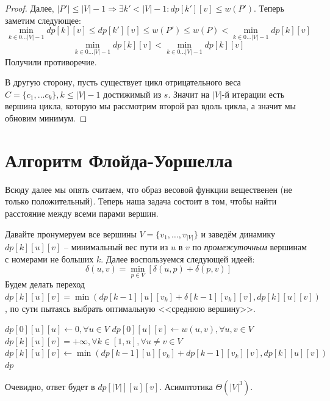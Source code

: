 \begin{proof}
    Далее, $|P'| \leq |V| - 1 \Rightarrow \exists k' < |V| - 1: dp[k'][v] \leq w(P')$. Теперь заметим следующее:
    \begin{equation*}
        \min\limits_{k \in 0 \dots |V| - 1} dp[k][v] \leq dp[k'][v] \leq w(P') \leq w(P) < \min\limits_{k \in 0 \dots |V| - 1} dp[k][v]
    \end{equation*}
    \begin{equation*}
        \min\limits_{k \in 0 \dots |V| - 1} dp[k][v] < \min\limits_{k \in 0 \dots |V| - 1} dp[k][v]
    \end{equation*}
    Получили противоречие.

    В другую сторону, пусть существует цикл отрицательного веса $C = \{c_1, \dots c_k\}, k \leq |V| - 1$ достижимый из $s$. Значит на $|V|$-й итерации есть вершина цикла, которую мы рассмотрим второй раз вдоль цикла, а значит мы обновим минимум.
\end{proof}

\section{Алгоритм Флойда-Уоршелла}

Всюду далее мы опять считаем, что образ весовой функции вещественен (не только положительный). Теперь наша задача состоит в том, чтобы найти расстояние между всеми парами вершин.

Давайте пронумеруем все вершины $V = \{v_1, \dots, v_{|V|}\}$ и заведём динамику $dp[k][u][v]$ -- минимальный вес пути из $u$ в $v$ по \textit{промежуточным} вершинам с номерами не больших $k$.
Далее воспользуемся следующей идеей:
\begin{equation*}
    \delta(u, v) = \min\limits_{p \in V} [\delta(u, p) + \delta(p, v)]
\end{equation*}
Будем делать переход $dp[k][u][v] = \min(dp[k - 1][u][v_k] + \delta[k - 1][v_k][v], dp[k][u][v])$, по сути пытаясь выбрать оптимальную <<среднюю вершину>>.

\begin{algorithm}[H]
\caption{Алгоритм Флойда-Уоршелла}
\begin{algorithmic}[1]

    \State $dp[0][u][u] \gets 0, \forall u \in V$
    \State $dp[0][u][v] \gets w(u, v), \forall u, v \in V$
    \State $dp[k][u][v] = +\infty, \forall k \in [1, n], \forall u \neq v \in V$
                \State $dp[k][u][v] \gets \min(dp[k - 1][u][v_k] + dp[k - 1][v_k][v], dp[k][u][v])$
            \EndFor
        \EndFor
    \EndFor
    \State \Return $dp$
\EndFunction
\end{algorithmic}
\end{algorithm}
Очевидно, ответ будет в $dp[|V|][u][v]$. Асимптотика $\Theta\left(|V|^3\right)$.

